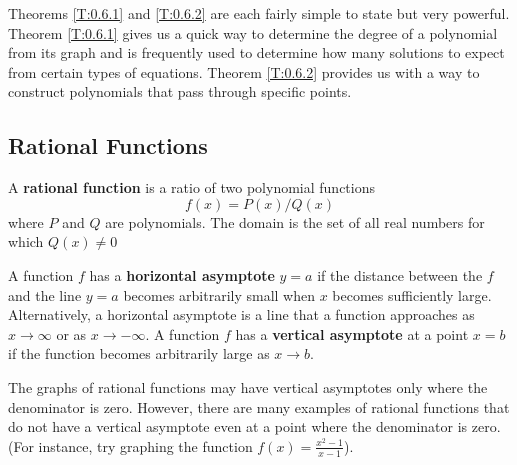 Theorems \ref{T:0.6.1} and \ref{T:0.6.2} are each fairly simple to state but very powerful.  Theorem \ref{T:0.6.1} gives us a quick way to determine the degree of a polynomial from its graph and is frequently used to determine how many solutions to expect from certain types of equations.  
Theorem \ref{T:0.6.2} provides us with a way to construct polynomials that pass through specific points.  



\subsection*{Rational Functions}

\begin{definition}
	A {\bf rational function} is a ratio of two polynomial functions
		\[ 
			f(x) = P(x)/Q(x)
		\]
	where $P$ and $Q$ are polynomials.  The domain is the set of all real numbers for which $Q(x)\ne 0$
\end{definition}

\begin{definition}
	A function $f$ has a {\bf horizontal asymptote} $y = a$ if the distance between the $f$ and the line $y=a$ becomes arbitrarily small when $x$ becomes sufficiently large.
	Alternatively, a horizontal asymptote is a line that a function approaches as $x \to \infty$ or as $x \to -\infty$. 
	A function $f$ has a {\bf vertical asymptote} at a point $x = b$ if the function becomes arbitrarily large as $x \to b$.
\end{definition}

The graphs of rational functions may have vertical asymptotes only where the denominator is zero.  However, there are many examples of rational functions that do not have a vertical asymptote even at a point where the denominator is zero. (For instance, try graphing the function $f(x)=\displaystyle{\frac{x^{2}-1}{x-1}}$).






